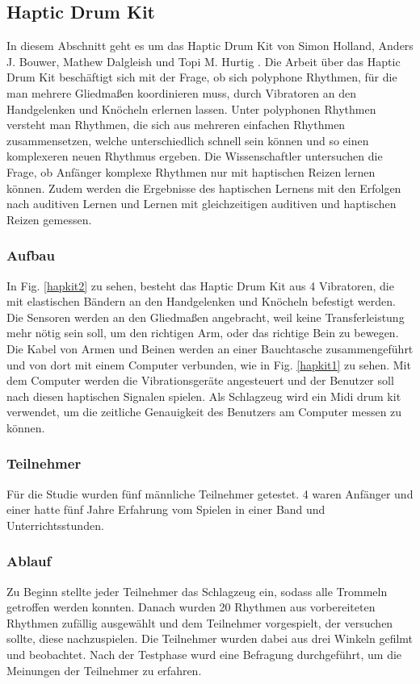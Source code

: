 \documentclass[ngerman,runningheads,a4paper]{llncs}
\begin{document}
\subsection{Haptic Drum Kit}
In diesem Abschnitt geht es um das Haptic Drum Kit von Simon Holland, Anders J. Bouwer, Mathew Dalgleish und Topi M. Hurtig \cite{10.1145/1709886.1709892}
.
Die Arbeit über das Haptic Drum Kit beschäftigt sich mit der Frage, ob sich polyphone Rhythmen, für die man mehrere Gliedmaßen koordinieren muss, durch Vibratoren an den Handgelenken und Knöcheln erlernen lassen.
Unter polyphonen Rhythmen versteht man Rhythmen, die sich aus mehreren einfachen Rhythmen zusammensetzen, welche unterschiedlich schnell sein können und so einen komplexeren neuen Rhythmus ergeben.
Die Wissenschaftler untersuchen die Frage, ob Anfänger komplexe Rhythmen nur mit haptischen Reizen lernen können.
Zudem werden die Ergebnisse des haptischen Lernens mit den Erfolgen nach auditiven Lernen und Lernen mit gleichzeitigen auditiven und haptischen Reizen gemessen.

\subsubsection{Aufbau}
In Fig. \ref{hapkit2} zu sehen, besteht das Haptic Drum Kit aus 4 Vibratoren, die mit elastischen Bändern an den Handgelenken und Knöcheln befestigt werden.
Die Sensoren werden an den Gliedmaßen angebracht, weil keine Transferleistung mehr nötig sein soll, um den richtigen Arm, oder das richtige Bein zu bewegen.
Die Kabel von Armen und Beinen werden an einer Bauchtasche zusammengeführt und von dort mit einem Computer verbunden, wie in Fig. \ref{hapkit1} zu sehen.
Mit dem Computer werden die Vibrationsgeräte angesteuert und der Benutzer soll nach diesen haptischen Signalen spielen.
Als Schlagzeug wird ein Midi drum kit verwendet, um die zeitliche Genauigkeit des Benutzers am Computer messen zu können.

\subsubsection{Teilnehmer}
Für die Studie wurden fünf männliche Teilnehmer getestet. 4 waren Anfänger und einer hatte fünf Jahre Erfahrung vom Spielen in einer Band und Unterrichtsstunden.

\subsubsection{Ablauf}
Zu Beginn stellte jeder Teilnehmer das Schlagzeug ein, sodass alle Trommeln getroffen werden konnten.
Danach wurden 20 Rhythmen aus vorbereiteten Rhythmen zufällig ausgewählt und dem Teilnehmer vorgespielt, der versuchen sollte, diese nachzuspielen.
Die Teilnehmer wurden dabei aus drei Winkeln gefilmt und beobachtet.
Nach der Testphase wurd eine Befragung durchgeführt, um die Meinungen der Teilnehmer zu erfahren.
\end{document}
